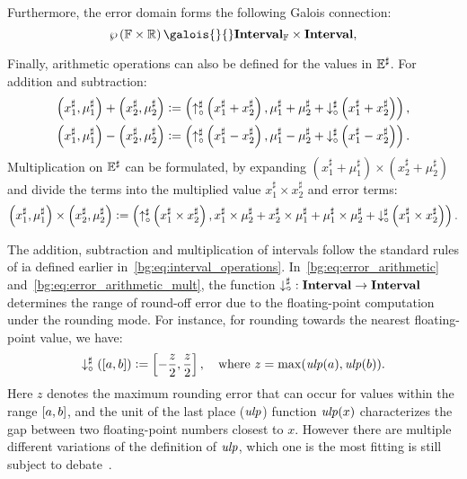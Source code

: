 Furthermore, the error domain forms the following Galois connection:
\begin{equation}
    \powersetof{\floatset\times\realset}
    \galois{}{}
    \floatintervalset\times\intervalset,
\end{equation}

Finally, arithmetic operations can also be defined for the values in
$\mathbb{E}^\sharp$.  For addition and subtraction:
\begin{equation}
    \begin{aligned}
    \left( x^\sharp_1, \mu^\sharp_1 \right) +
    \left( x^\sharp_2, \mu^\sharp_2 \right)
    &\vcentcolon=
        \left(
            \operatorname{\uparrow^\sharp_\circ}\left(x^\sharp_1 + x^\sharp_2\right),
            \mu^\sharp_1 + \mu^\sharp_2 +
            \operatorname{\downarrow^\sharp_\circ}\left(x^\sharp_1 + x^\sharp_2\right)
        \right), \\
    \left( x^\sharp_1, \mu^\sharp_1 \right) -
    \left( x^\sharp_2, \mu^\sharp_2 \right)
    &\vcentcolon=
        \left(
            \operatorname{\uparrow^\sharp_\circ}\left(x^\sharp_1 - x^\sharp_2\right),
            \mu^\sharp_1 - \mu^\sharp_2 +
            \operatorname{\downarrow^\sharp_\circ}\left(x^\sharp_1 - x^\sharp_2\right)
        \right).
    \end{aligned}
    \label{bg:eq:error_arithmetic}
\end{equation}
Multiplication on $\mathbb{E}^\sharp$ can be formulated, by expanding $\left(
x^\sharp_1 + \mu^\sharp_1 \right) \times \left( x^\sharp_2 + \mu^\sharp_2
\right)$ and divide the terms into the multiplied value $x^\sharp_1 \times
x^\sharp_2$ and error terms:
\begin{equation}
    \left( x^\sharp_1, \mu^\sharp_1 \right) \times
    \left( x^\sharp_2, \mu^\sharp_2 \right)
    \vcentcolon=
        \left(
            \operatorname{\uparrow^\sharp_\circ}\left(x^\sharp_1 \times x^\sharp_2\right),
            x^\sharp_1 \times \mu^\sharp_2 + x^\sharp_2 \times \mu^\sharp_1 +
            \mu^\sharp_1 \times \mu^\sharp_2 +
            \operatorname{\downarrow^\sharp_\circ}\left(x^\sharp_1 \times x^\sharp_2\right)
        \right).
    \label{bg:eq:error_arithmetic_mult}
\end{equation}

The addition, subtraction and multiplication of intervals follow the standard
rules of \gls{ia} defined earlier in~\eqref{bg:eq:interval_operations}.
In~\eqref{bg:eq:error_arithmetic} and~\eqref{bg:eq:error_arithmetic_mult}, the
function $\operatorname{\downarrow^\sharp_\circ}: \mathbf{Interval} \to \mathbf{Interval}$ determines the range of
round-off error due to the floating-point computation under the rounding mode.
For instance, for rounding towards the nearest floating-point value, we have:
\begin{equation}
    \downarrow^\sharp_\circ(\left[{a}, {b}\right]) \vcentcolon=
        \left[ -\frac{z}{2}, \frac{z}{2}\right], \quad \text{where~}
        z = \max(\operatorname{\mathit{ulp}}(a), \operatorname{\mathit{ulp}}(b)).
\end{equation}
Here $z$ denotes the maximum rounding error that can occur for values
within the range $\left[{a}, {b}\right]$, and the unit of the last place ($\operatorname{\mathit{ulp}}$)
function $\operatorname{\mathit{ulp}}(x)$ characterizes the gap between two floating-point numbers
closest to $x$.  However there are multiple different variations of the
definition of $\operatorname{\mathit{ulp}}$, which one is the most fitting is still subject to
debate~\cite{muller}.

